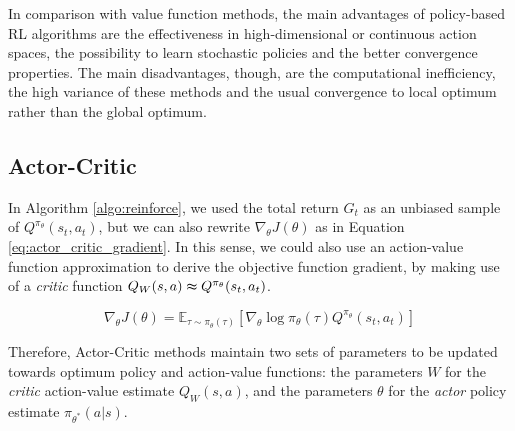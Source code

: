 In comparison with value function methods, the main advantages of policy-based RL algorithms are the effectiveness in high-dimensional or continuous action spaces, the possibility to learn stochastic policies and the better convergence properties. The main disadvantages, though, are the computational inefficiency, the high variance of these methods and the usual convergence to local optimum rather than the global optimum.


\subsection{Actor-Critic}

In Algorithm \ref{algo:reinforce}, we used the total return $G_t$ as an unbiased sample of $Q^{\pi_{\theta}}(s_t,a_t)$, but we can also rewrite $\nabla_{\theta} J(\theta)$ as in Equation \eqref{eq:actor_critic_gradient}. In this sense, we could also use an action-value function approximation to derive the objective function gradient, by making use of a \textit{critic} function $Q_W(s,a) \thickapprox Q^{\pi_{\theta}}(s_t,a_t)$.

\begin{equation}
\nabla_{\theta} J(\theta) = \mathbb{E}_{\tau \sim \pi_{\theta}(\tau)} \left[ \nabla_{\theta} \log{\pi_{\theta}(\tau)} Q^{\pi_{\theta}}(s_t,a_t) \right]
\label{eq:actor_critic_gradient}
\end{equation}

Therefore, Actor-Critic methods maintain two sets of parameters to be updated towards optimum policy and action-value functions: the parameters $W$ for the \textit{critic} action-value estimate $Q_W(s,a)$, and the parameters $\theta$ for the \textit{actor} policy estimate $\pi_{\theta^*}(a|s)$.

